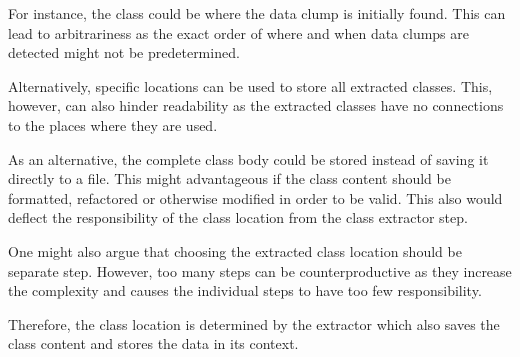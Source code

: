For instance, the class could be where the data clump is initially found. This can lead to arbitrariness as the exact order of where and when data clumps are detected might not be predetermined. 

Alternatively, specific locations can be used to store all extracted classes. This, however, can also hinder readability as the extracted classes have no connections to the places where they are used. 

As an alternative, the complete class body could be stored instead of saving it directly to a file. This might advantageous if the class content should be formatted, refactored or otherwise modified in order to be valid. This also would deflect the responsibility of the class location from the class extractor step. 

One might also argue that choosing the extracted class location should be separate step. 
However, too many steps can be counterproductive as they increase the complexity and causes the individual steps to have too few responsibility.

Therefore, the class location is determined by the extractor which also saves the class content and stores the data in its context. 

\begin{comment}

\section{Pipeline execution example}
Listing \ref{lst:math_stuff_java} will be used as the foundation to describe a detailed approach for fixing data clumps.

Looking at the parameters \textit{x}, \textit{y}, and \textit{z}, there are multiple suggestions for a class name. The most trivial one is a simple concatenation  (e.g., \textit{XYZ} or \textit{X\_Y\_Z}). However, this name is often not suitable as it can be hard to read and to understand its meaning.

A more suitable approach requires domain knowledge. It is common knowledge that the terms \textit{x}, \textit{y}, and \textit{z} are terms used in math to describe coordinates. Using this information, a fitting name could be \textit{Coordinate}. Simple methods would not have discovered this name as artificial or human intelligence is required. 



Since a suitable class name has been found, the following class can be created using previously obtained information. 

Listing \ref{lst:coordinate_java} shows an example implementation of a coordinate class. This class contains fields, getters, and setters for all method parameters. There is also a constructor for initialization. This respects Fowler's opinion that the extracted class should not be a mere data class but a functional class that can be easily extended and modified.


\end{comment}






\hfill

